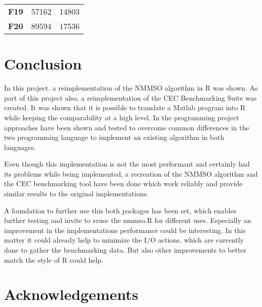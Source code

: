\documentclass[12pt,a4paper]{article}
\begin{document}
\begin{longtable}[c]{@{}crr@{}}
\begin{minipage}[t]{0.13\columnwidth}
\textbf{F19}
\strut\end{minipage} &
\begin{minipage}[t]{0.09\columnwidth}\raggedleft\strut
57162
\strut\end{minipage} &
\begin{minipage}[t]{0.25\columnwidth}\raggedleft\strut
14803
\strut\end{minipage}\tabularnewline
\begin{minipage}[t]{0.13\columnwidth}\centering\strut
\textbf{F20}
\strut\end{minipage} &
\begin{minipage}[t]{0.09\columnwidth}\raggedleft\strut
89594
\strut\end{minipage} &
\begin{minipage}[t]{0.25\columnwidth}\raggedleft\strut
17536
\strut\end{minipage}\tabularnewline
\bottomrule
\end{longtable}

\section{Conclusion}\label{conclusion}

In this project. a reimplementation of the NMMSO algorithm in R was
shown. As part of this project also, a reimplementation of the CEC
Benchmarking Suite was created. It was shown that it is possible to
translate a Matlab program into R while keeping the comparability at a
high level. In the programming project approaches have been shown and
tested to overcome common differences in the two programming language to
implement an existing algorithm in both languages.

Even though this implementation is not the most performant and certainly
had its problems while being implemented, a recreation of the NMMSO
algorithm and the CEC benchmarking tool have been done which work
reliably and provide similar results to the original implementations.

A foundation to further use this both packages has been set, which
enables further testing and invite to reuse the nmmso.R for different
uses. Especially an improvement in the implementations performance could
be interesting. In this matter it could already help to minimize the I/O
actions, which are currently done to gather the benchmarking data. But
also other improvements to better match the style of R could help.

\section{Acknowledgements}\label{acknowledgements}
\end{document}
